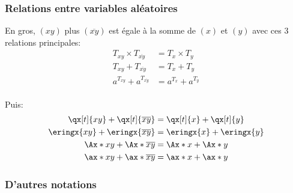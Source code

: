\documentclass[10pt, french]{article}
\begin{document}
\begin{multicols*}{2}
\subsubsection*{Relations entre variables aléatoires}
En gros, $(xy)$ plus $(\overline{xy})$ est égale à la somme de $(x)$ et $(y)$ avec ces 3 relations principales:
\begin{align*}
	T_{xy} \times T_{\overline{xy}}
	&=	T_{x} \times T_{y}	\\
	T_{xy} + T_{\overline{xy}}
	&=	T_{x} + T_{y}	\\
	a^{T_{xy}} + a^{T_{\overline{xy}}}
	&=	a^{T_{x}} + a^{T_{y}}	\\
\end{align*}

Puis:
\begin{align*}
	\qx[t]{xy} + \qx[t]{\overline{xy}}	&=	\qx[t]{x} + \qx[t]{y}	\\
	\eringx{xy} + \eringx{\overline{xy}}	&=	\eringx{x} + \eringx{y}	\\
	\Ax*{xy} + \Ax*{\overline{xy}}	&=	\Ax*{x} + \Ax*{y}	\\
	\ax*{xy} + \ax*{\overline{xy}}	&=	\ax*{x} + \ax*{y}	\\
\end{align*}

\subsubsection*{D'autres notations}


\end{multicols*}
\end{document}
